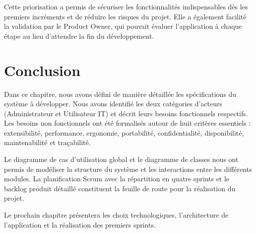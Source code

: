 Cette priorisation a permis de sécuriser les fonctionnalités indispensables dès les premiers incréments et de réduire les risques du projet. Elle a également facilité la validation par le Product Owner, qui pouvait évaluer l'application à chaque étape au lieu d'attendre la fin du développement.

    \section{Conclusion}
Dans ce chapitre, nous avons d\'{e}fini de mani\`{e}re d\'{e}taill\'{e}e les sp\'{e}cifications du syst\`{e}me \`{a} d\'{e}velopper. Nous avons identifi\'{e} les deux cat\'{e}gories d'acteurs (Administrateur et Utilisateur IT) et d\'{e}crit leurs besoins fonctionnels respectifs. Les besoins non fonctionnels ont \'{e}t\'{e} formalis\'{e}s autour de huit crit\`{e}res essentiels : extensibilit\'{e}, performance, ergonomie, portabilit\'{e}, confidentialit\'{e}, disponibilit\'{e}, maintenabilit\'{e} et tra\c{c}abilit\'{e}.

Le diagramme de cas d'utilisation global et le diagramme de classes nous ont permis de mod\'{e}liser la structure du syst\`{e}me et les interactions entre les diff\'{e}rents modules. La planification Scrum avec la r\'{e}partition en quatre sprints et le backlog produit d\'{e}taill\'{e} constituent la feuille de route pour la r\'{e}alisation du projet.

Le prochain chapitre pr\'{e}sentera les choix technologiques, l'architecture de l'application et la r\'{e}alisation des premiers sprints.

